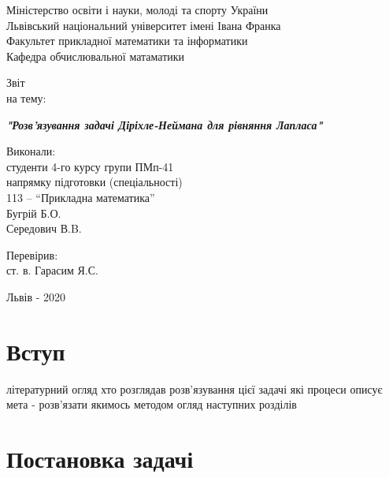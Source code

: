 \documentclass[14pt,a4paper]{extarticle}
\newcounter{e}
\newcounter{tabl}
\begin{document}
	
	
	
	\thispagestyle{empty}
	
	\begin{center}
		\large
		Міністерство освіти і науки, молоді та спорту України \\
		Львівський національний університет імені Івана Франка \\
		Факультет прикладної математики та інформатики \\
		Кафедра обчислювальної матаматики
	\end{center}
	
	\vspace{45pt}
	
	\vfill
	
	\begin{center}
		{\Huge{Звіт}}\\
		{\large на тему:}
	\end{center}
	
	\begin{center}\Large
		\textbf{\emph{"Розв'язування задачі Діріхле-Неймана для рівняння Лапласа"}}
	\end{center}
	
	\vfill
	\vskip100pt
	
	\begin{flushleft}
		\hskip8cm 
		Виконали:
		\\ \hskip8cm 
		студенти 4-го курсу групи ПМп-41
		\\ \hskip8cm
		напрямку підготовки (спеціальності)
		\\ \hskip8cm
		113 -- ``Прикладна математика''
		\\ \hskip8cm
		Бугрій Б.О.
		\\ \hskip8cm
		Середович В.B.
	\end{flushleft}
	
	\begin{flushleft}
		\hskip8cm 
		Перевірив:
		\\ \hskip8cm
		ст. в. Гарасим Я.С.
	\end{flushleft}
	
	\vfill
	
	\begin{center}
		\large
		Львів - 2020
	\end{center}
	
	\newpage
	\thispagestyle{empty}
	\tableofcontents
	
	\newpage
	\thispagestyle{empty}
	\section*{Вступ}
	\begin{center}\end{center}
	літературний огляд
	хто розглядав розв'язування цієї задачі
	які процеси описує
	мета - розв'язати якимось методом
	огляд наступних розділів
	
	\newpage
	\thispagestyle{empty}
	\section{Постановка задачі}
	
	
\end{document}
